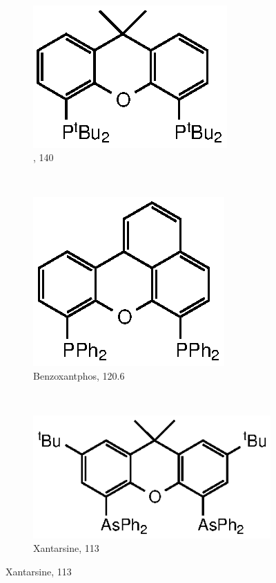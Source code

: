 \begin{figure}[htbp]
~
\begin{subfigure}[b]{0.3\textwidth}
	\centering
	\includegraphics{../Figures/Xantphosderivatives/tBu-xantphos.eps}
	\caption{\tBuxantphos, 140\degrees}
	\label{tBuxantphos}
\end{subfigure}
~
\begin{subfigure}[b]{0.3\textwidth}
	\includegraphics{../Figures/Xantphosderivatives/Benzoxantphos.eps}
	\caption{Benzoxantphos, 120.6\degrees}
	\label{Benzoxantphos}
\end{subfigure}
\\
\vspace{0.5cm}
\begin{subfigure}[b]{0.35\textwidth}
	\centering
	\includegraphics{../Figures/Xantphosderivatives/Xantarsine.eps}
	\caption{Xantarsine, 113\degrees}
	\label{Xantarsine}
\end{subfigure}

\end{figure}
